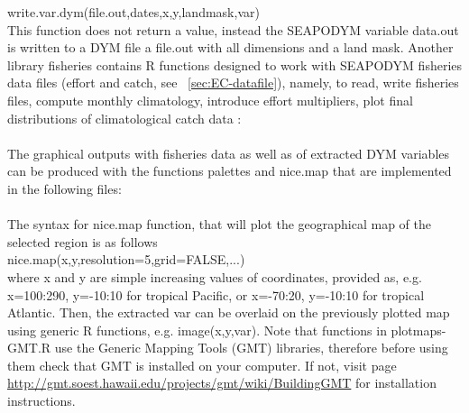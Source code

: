 {\ttfamily  write.var.dym(file.out,dates,x,y,landmask,var)}\\

\noindent This function does not return a value, instead the SEAPODYM variable {\ttfamily data.out} is written to a DYM file a {\ttfamily file.out} with all dimensions and a land mask. Another library {\ttfamily fisheries} contains R functions designed to work with SEAPODYM fisheries data files (effort and catch, see ~\ref{sec:EC-datafile}), namely, to read, write fisheries files, compute monthly climatology, introduce effort multipliers, plot final distributions of climatological catch data :\\

\\

\noindent The graphical outputs with fisheries data as well as of extracted DYM variables can be produced with the functions {\ttfamily palettes} and {\ttfamily nice.map} that are implemented in the following files:\\

\\

\noindent The syntax for {\ttfamily nice.map} function, that will plot the geographical map of the selected region is as follows\\

{\ttfamily  nice.map(x,y,resolution=5,grid=FALSE,...)}\\

\noindent where {\ttfamily x} and {\ttfamily y} are simple increasing values of coordinates, provided as, e.g. {\ttfamily x=100:290, y=-10:10} for tropical Pacific, or {\ttfamily x=-70:20, y=-10:10} for tropical Atlantic. Then, the extracted {\ttfamily var} can be overlaid on the previously plotted map using generic R functions, e.g. {\ttfamily image(x,y,var)}. Note that functions in {\ttfamily plotmaps-GMT.R} use the Generic Mapping Tools (GMT) libraries, therefore before using them check that GMT is installed on your computer. If not, visit page \url{http://gmt.soest.hawaii.edu/projects/gmt/wiki/BuildingGMT} for installation instructions.  \\

